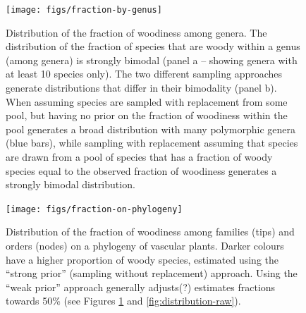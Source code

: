 \documentclass[12pt]{article}
\begin{document}
\begin{figure}[p]
  \centering
  \texttt{[image: figs/fraction-by-genus]}
  \caption{Distribution of the fraction of woodiness among genera.
    The distribution of the fraction of species that are woody within
    a genus (among genera) is strongly bimodal (panel a -- showing
    genera with at least 10 species only).
    The two different sampling approaches generate distributions that
    differ in their bimodality (panel b).  When assuming species are
    sampled with replacement from some pool, but having no prior on
    the fraction of woodiness within the pool generates a broad
    distribution with many polymorphic genera (blue bars), while
    sampling with replacement assuming that species are drawn from a
    pool of species that has a fraction of woody species equal to the
    observed fraction of woodiness generates a strongly bimodal
    distribution.}
  \label{fig:distribution-genera}
\end{figure}

\begin{figure}[p]
  \centering
  \texttt{[image: figs/fraction-on-phylogeny]}
  \caption{Distribution of the fraction of woodiness among families
    (tips) and orders (nodes) on a phylogeny of vascular plants.
    Darker colours have a higher proportion of woody species,
    estimated using the ``strong prior'' (sampling without
    replacement) approach.  Using the ``weak prior'' approach
    generally adjusts(?) estimates fractions towards 50\% (see Figures
    \ref{fig:distribution-genera} and \ref{fig:distribution-raw}).}
\label{fig:phylogeny}
\end{figure}
\end{document}
